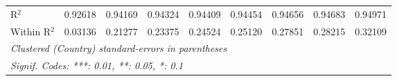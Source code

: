 \begin{table}[htbp]
\begin{tabular}{lcccccccc}
      R$^2$                                   & 0.92618         & 0.94169        & 0.94324       & 0.94409       & 0.94454  & 0.94656  & 0.94683  & 0.94971\\  
      Within R$^2$                            & 0.03136         & 0.21277        & 0.23375       & 0.24524       & 0.25120  & 0.27851  & 0.28215  & 0.32109\\  
      \midrule \midrule
      \multicolumn{9}{l}{\emph{Clustered (Country) standard-errors in parentheses}}\\
      \multicolumn{9}{l}{\emph{Signif. Codes: ***: 0.01, **: 0.05, *: 0.1}}\\
   \end{tabular}
\end{table}


